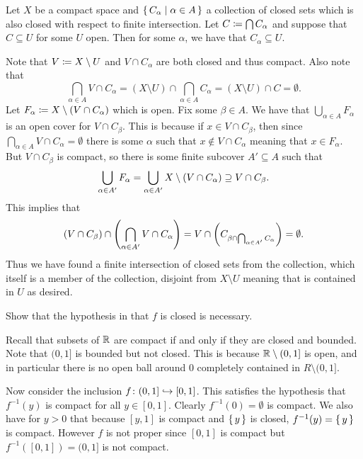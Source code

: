\documentclass[letterpaper, 11pt, oneside]{book}
\begin{document}
\begin{exercise}
  Let $X$ be a compact space and $\set{C_{\alpha} | \alpha \in A}$ a collection of closed sets which is also closed with respect to finite intersection.
  Let $C \coloneqq \bigcap C_{\alpha}$ and suppose that $C \subseteq U$ for some $U$ open.
  Then for some $\alpha$, we have that $C_{\alpha} \subseteq U$.
\end{exercise}
\begin{pf}
  Note that $V \coloneqq X \setminus U$ and $V \cap C_{\alpha}$ are both closed and thus compact.
  Also note that
  \[
    \bigcap_{\alpha \in A} V \cap C_{\alpha} = (X \setminus U) \cap \bigcap_{\alpha \in A} C_{\alpha} = (X \setminus U) \cap C = \emptyset.
  \]
  Let $F_{\alpha} \coloneqq X \setminus (V \cap C_{\alpha})$ which is open.
  Fix some $\beta \in A$.
  We have that $\bigcup_{\alpha \in A} F_{\alpha}$ is an open cover for $V \cap C_{\beta}$.
  This is because if $x \in V \cap C_{\beta}$, then since $\bigcap_{\alpha \in A} V \cap C_{\alpha} = \emptyset$ there is some $\alpha$ such that $x \notin V \cap C_{\alpha}$ meaning that $x \in F_{\alpha}$.
  But $V \cap C_{\beta}$ is compact, so there is some finite subcover $A' \subseteq A$ such that
  \[
    \bigcup_{\alpha \in A'} F_{\alpha} = \bigcup_{\alpha \in A'} X \setminus (V \cap C_{\alpha}) \supseteq V \cap C_{\beta}.
  \]
  This implies that
  \[
    (V \cap C_{\beta}) \cap \pqty{\bigcap_{\alpha \in A'} V \cap C_{\alpha}} = V \cap \pqty{C_{\beta \cap \bigcap_{\alpha \in A'} C_{\alpha}}} = \emptyset.
  \]
  Thus we have found a finite intersection of closed sets from the collection, which itself is a member of the collection, disjoint from $X \setminus U$ meaning that is contained in $U$ as desired.
\end{pf}

\begin{exercise}
  Show that the hypothesis in  that $f$ is closed is necessary.
\end{exercise}
\begin{pf}
  Recall that subsets of $\mathbb{R}$ are compact if and only if they are closed and bounded.
  Note that $(0, 1]$ is bounded but not closed.
  This is because $\mathbb{R} \setminus (0, 1]$ is open, and in particular there is no open ball around $0$ completely contained in $R \setminus (0, 1]$.

  Now consider the inclusion $f\colon (0, 1] \into [0, 1]$.
  This satisfies the hypothesis that $f^{-1}(y)$ is compact for all $y \in [0, 1]$.
  Clearly $f^{-1}(0) = \emptyset$ is compact.
  We also have for $y > 0$ that because $[y, 1]$ is compact and $\set{y}$ is closed, $f^{-1}(y) = \set{y}$ is compact.
  However $f$ is not proper since $[0, 1]$ is compact but $f^{-1}([0, 1]) = (0, 1]$ is not compact.
\end{pf}
\end{document}

